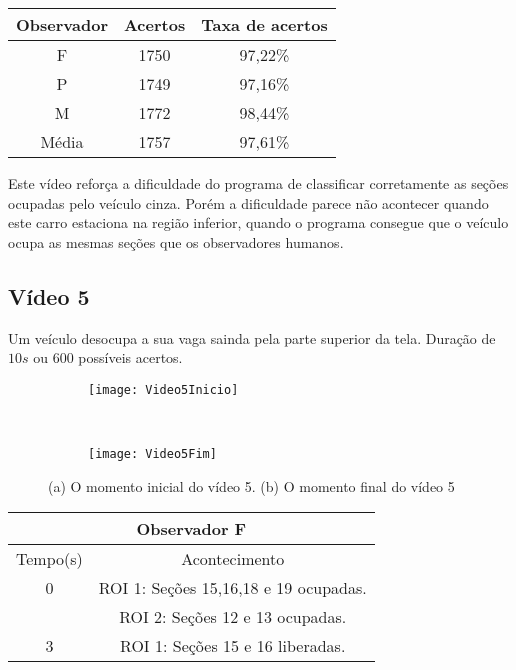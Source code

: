 \begin{center}
\begin{tabular}{|c||c||c|}
\hline
Observador & Acertos & Taxa de acertos \\ \hline
F & 1750 & 97,22\% \\  \hline
P & 1749 & 97,16\% \\ \hline
M & 1772 & 98,44\% \\ \hline
Média & 1757 & 97,61\% \\
\hline
\end{tabular}
\end{center}

Este vídeo reforça a dificuldade do programa de classificar corretamente as seções ocupadas pelo veículo cinza. Porém a dificuldade parece não acontecer quando este carro estaciona na região inferior, quando o programa consegue que o veículo ocupa as mesmas seções que os observadores humanos.


\subsection{Vídeo 5}

Um veículo desocupa a sua vaga sainda pela parte superior da tela. Duração de $10s$ ou $600$ possíveis acertos.

\begin{figure}[!h]
\centering
\begin{subfigure}{.5\textwidth}
\centering
\texttt{[image: Video5Inicio]}
\caption{}
\end{subfigure}\
\begin{subfigure}{.5\textwidth}
\centering
\texttt{[image: Video5Fim]}
\caption{}
\end{subfigure}
\centering
\caption{(a) O momento inicial do vídeo 5. (b) O momento final do vídeo 5}%
\label{}%
\end{figure}

\begin{center}
\begin{tabular}{|c||c|}
\hline
\multicolumn{2}{|c|}{Observador F}  \\ \hline \hline
Tempo(s) & Acontecimento \\ \hline
0 & ROI 1: Seções 15,16,18 e 19 ocupadas. \\
 & ROI 2: Seções 12 e 13 ocupadas. \\ \hline
3 & ROI 1: Seções 15 e 16 liberadas. \\
\hline
\end{tabular}
\end{center}

